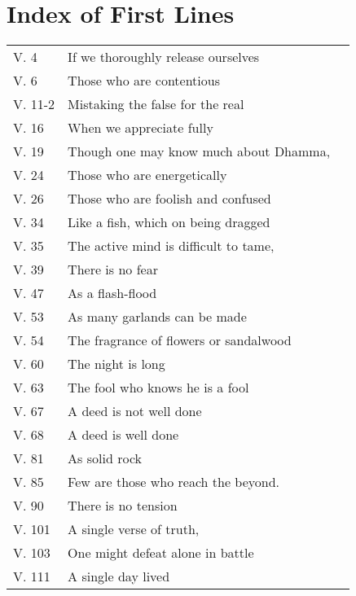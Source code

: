 
\chapter{Index of First Lines}

{\smaller
\setlength{\parskip}{0pt}
\setlength{\parindent}{0pt}

\begin{longtable}[c]{llr}
V. 4 & If we thoroughly release ourselves & \pageref{dhp-4}\\
V. 6 & Those who are contentious & \pageref{dhp-6}\\
V. 11-2 & Mistaking the false for the real & \pageref{dhp-11}\\
V. 16 & When we appreciate fully & \pageref{dhp-16}\\
V. 19 & Though one may know much about Dhamma, & \pageref{dhp-19}\\
V. 24 & Those who are energetically & \pageref{dhp-24}\\
V. 26 & Those who are foolish and confused & \pageref{dhp-26}\\
V. 34 & Like a fish, which on being dragged  & \pageref{dhp-34}\\
V. 35 & The active mind is difficult to tame, & \pageref{dhp-35}\\
V. 39 & There is no fear & \pageref{dhp-39}\\
V. 47 & As a flash-flood & \pageref{dhp-47}\\
V. 53 & As many garlands can be made & \pageref{dhp-53}\\
V. 54 & The fragrance of flowers or sandalwood & \pageref{dhp-54}\\
V. 60 & The night is long & \pageref{dhp-60}\\
V. 63 & The fool who knows he is a fool & \pageref{dhp-63}\\
V. 67 & A deed is not well done & \pageref{dhp-67}\\
V. 68 & A deed is well done & \pageref{dhp-68}\\
V. 81 & As solid rock & \pageref{dhp-81}\\
V. 85 & Few are those who reach the beyond. & \pageref{dhp-85}\\
V. 90 & There is no tension & \pageref{dhp-90}\\
V. 101 & A single verse of truth, & \pageref{dhp-101}\\
V. 103 & One might defeat alone in battle & \pageref{dhp-103}\\
V. 111 & A single day lived & \pageref{dhp-111}\\

\end{longtable}}
